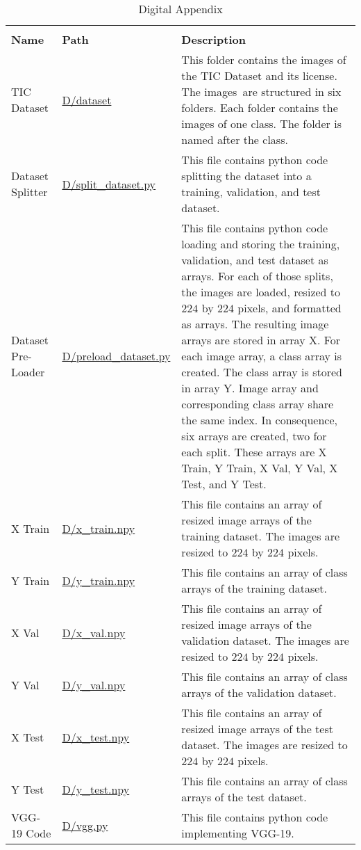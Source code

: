 \begin{xltabular}{\textwidth}{llX}\toprule
	\caption{Digital Appendix} \label{tab:digiappend}\\
	\textbf{Name} & \textbf{Path} & \textbf{Description} \\\midrule \endhead
	\ac{TIC Dataset} & \url{D/dataset} & This folder contains the images of the \ac{TIC Dataset} and its license. The images~are structured in six folders. Each folder contains the images of one class. The folder is named after the class.\\\midrule
	Dataset Splitter & \url{D/split_dataset.py} & This file contains python code splitting the dataset into a training, validation, and test dataset.\\\midrule
	Dataset Pre-Loader & \url{D/preload_dataset.py} & This file contains python code loading and storing the training, validation, and test dataset as arrays. For each of those splits, the images are loaded, resized to $224$ by $224$ pixels, and formatted as arrays. The resulting image arrays are stored in array X. For each image array, a class array is created. The class array is stored in array Y. Image array and corresponding class array share the same index. In consequence, six arrays are created, two for each split. These arrays are X Train, Y Train, X Val, Y Val, X Test, and Y Test.\\\midrule
	X Train & \url{D/x_train.npy} & This file contains an array of resized image arrays of the training dataset. The images are resized to $224$ by $224$ pixels.\\\midrule
	Y Train & \url{D/y_train.npy} & This file contains an array of class arrays of the training dataset.\\\midrule
	X Val & \url{D/x_val.npy} & This file contains an array of resized image arrays of the validation dataset. The images are resized to $224$ by $224$ pixels.\\\midrule
	Y Val & \url{D/y_val.npy} & This file contains an array of class arrays of the validation dataset.\\\midrule
	X Test & \url{D/x_test.npy} & This file contains an array of resized image arrays of the test dataset. The images are resized to $224$ by $224$ pixels.\\\midrule
	Y Test & \url{D/y_test.npy} & This file contains an array of class arrays of the test dataset.\\\midrule
	VGG-19 Code & \url{D/vgg.py} & This file contains python code implementing VGG-19.\\\midrule

\end{xltabular}
